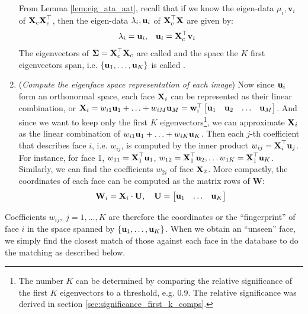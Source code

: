 \documentclass[a4paper]{article}
\begin{document}
\begin{enumerate}
		From Lemma \ref{lem:eig_ata_aat}, recall that if we know the eigen-data $\mu_i, \textbf{v}_i$ of $\textbf{X}_c\textbf{X}_c^{\top}$, then the eigen-data $\lambda_i, \textbf{u}_i$ of $\textbf{X}_c^{\top}\textbf{X}$ are given by:
		\begin{align}
			\lambda_i = \textbf{u}_i, & & & \textbf{u}_i = \textbf{X}_c^{\top}\textbf{v}_i	
			\label{eq:eif_of_XTX_given_XXT}
		\end{align}
		The eigenvectors of $\boldsymbol{\Sigma} = \textbf{X}_c^{\top}\textbf{X}_c$ are called  and the space the $K$ first eigenvectors span, i.e. $\{\textbf{u}_1,\ldots,\textbf{u}_K\}$ is called .  
	\item(\textit{Compute the eigenface space representation of each image})
Now since $\textbf{u}_i$ form an orthonormal space, each face $\textbf{X}_i$ can be represented as their linear combination, or $\textbf{X}_i = w_{i1}\textbf{u}_1 + \ldots + w_{iM}\textbf{u}_M = \textbf{w}_i^{\top} \begin{bmatrix}
	\textbf{u}_1 & \textbf{u}_2 & \ldots & \textbf{u}_M	
\end{bmatrix}$. And since we want to keep only the first $K$ eigenvectors\footnote{The number $K$ can be determined by comparing the relative significance of the first $K$ eigenvectors to a threshold, e.g. 0.9. The relative significance was derived in section \ref{sec:significance_first_k_comps}.}, we can approximate $\textbf{X}_i$ as the linear combination of $w_{i1}\textbf{u}_1 + \ldots + w_{iK}\textbf{u}_K$. Then each $j$-th coefficient that describes face $i$, i.e. $w_{ij}$, is computed by the inner product $w_{ij} = \textbf{X}_i^{\top}\textbf{u}_j$. For instance, for face 1, $w_{11} = \textbf{X}_1^{\top}\textbf{u}_1$, $w_{12} = \textbf{X}_1^{\top}\textbf{u}_2,\ldots w_{1K} = \textbf{X}_1^{\top}\textbf{u}_K$. Similarly, we can find the coefficients $w_{2i}$ of face $\textbf{X}_2$. More compactly, the coordinates of each face can be computed as the matrix rows of $\textbf{W}$:
\begin{equation}
	\textbf{W}_i = \textbf{X}_i \cdot \textbf{U}, \quad
		\textbf{U}= \begin{bmatrix}
		\textbf{u}_1 & \ldots & \textbf{u}_K	
	\end{bmatrix}	
	\label{eq:eigenface_coords_matrix}
\end{equation}
\end{enumerate}
Coefficients $w_{ij}, \; j =1,\ldots,K$ are therefore the coordinates or the ``fingerprint'' of face $i$ in the space spanned by $\{\textbf{u}_1,\ldots,\textbf{u}_K\}$. When we obtain an ``unseen'' face, we simply find the closest match of those against each face in the database to do the matching as described below.
\end{document}
